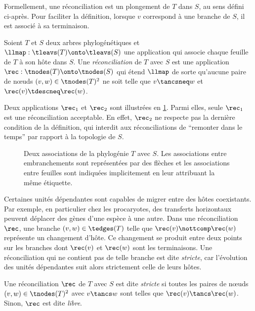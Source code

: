 Formellement, une réconciliation est un plongement de \(T\) dans \(S\), au sens défini ci-après.
Pour faciliter la définition, lorsque \(v\) correspond à une branche de \(S\), il est associé à sa terminaison.

\begin{definition}[Réconciliation]\label{definition:rec}
    Soient \(T\) et \(S\) deux arbres phylogénétiques et \(\llmap : \tleavs(T) \onto \tleavs(S)\) une application qui associe chaque feuille de \(T\) à son hôte dans \(S\).
    Une \emph{réconciliation} de \(T\) avec \(S\) est une application \(\rec : \tnodes(T) \onto \tnodes(S)\) qui étend \(\llmap\) de sorte qu’aucune paire de nœuds \((v, w) \in \tnodes(T)^2\) ne soit telle que \(v \tancsneq w\) et \(\rec(v) \tdescneq \rec(w)\).
\end{definition}

Deux applications \(\rec_1\) et \(\rec_2\) sont illustrées en \cref{figure:strict-rec}.
Parmi elles, seule \(\rec_1\) est une réconciliation acceptable.
En effet, \(\rec_2\) ne respecte pas la dernière condition de la définition, qui interdit aux réconciliations de \enquote{remonter dans le temps} par rapport à la topologie de \(S\).

\begin{figure}[htb]
    \capstart
    \centering
    
    \caption{
        Deux associations de la phylogénie \(T\) avec \(S\).
        Les associations entre embranchements sont représentées par des flèches et les associations entre feuilles sont indiquées implicitement en leur attribuant la même étiquette.
    }
    \label{figure:strict-rec}
\end{figure}

Certaines unités dépendantes sont capables de migrer entre des hôtes coexistants.
Par exemple, en particulier chez les procaryotes, des transferts horizontaux peuvent déplacer des gènes d’une espèce à une autre.
Dans une réconciliation \(\rec\), une branche \((v, w) \in \tedges(T)\) telle que \(\rec(v) \nottcomp \rec(w)\) représente un changement d’hôte.
Ce changement se produit entre deux points sur les branches dont \(\rec(v)\) et \(\rec(w)\) sont les terminaisons.
Une réconciliation qui ne contient pas de telle branche est dite \emph{stricte}, car l’évolution des unités dépendantes suit alors strictement celle de leurs hôtes.

\begin{definition}\label{definition:rec-strict}
    Une réconciliation \(\rec\) de \(T\) avec \(S\) est dite \emph{stricte} si toutes les paires de nœuds
    \((v, w) \in \tnodes(T)^2\) avec \(v \tancs w\) sont telles que \(\rec(v) \tancs \rec(w)\).
    Sinon, \(\rec\) est dite \emph{libre}.
\end{definition}

